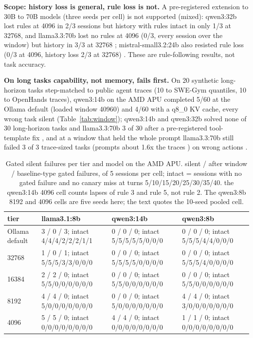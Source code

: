 \documentclass[conference,10pt]{IEEEtran}
\begin{document}
\textbf{Scope: history loss is general, rule loss is not.} A pre-registered extension to 30B to 70B models (three seeds per cell) is not supported (mixed): qwen3:32b lost rules at 4096 in 2/3 sessions but history with rules intact in only 1/3 at 32768, and llama3.3:70b lost no rules at 4096 (0/3, every session over the window) but history in 3/3 at 32768%
; mistral-small3.2:24b also resisted rule loss (0/3 at 4096, history loss 2/3 at 32768)%
. These are rule-following results, not task accuracy.

\textbf{On long tasks capability, not memory, fails first.} On 20 synthetic long-horizon tasks step-matched to public agent traces (10 to SWE-Gym quantiles, 10 to OpenHands traces), qwen3:14b on the AMD APU completed 5/60 at the Ollama default (loaded window 40960) and 4/60 with a q8\_0 KV cache, every wrong task silent %
(Table~\ref{tab:window}); qwen3:14b and qwen3:32b solved none of 30 long-horizon tasks and llama3.3:70b 3 of 30 after a pre-registered tool-template fix%
, and at a window that held the whole prompt llama3.3:70b still failed 3 of 3 trace-sized tasks (prompts about 1.6x the traces%
) on wrong actions%
.

\begin{table}[t]
\caption{Gated silent failures per tier and model on the AMD APU. silent / after window / baseline-type gated failures, of 5 sessions per cell; intact = sessions with no gated failure and no canary miss at turns 5/10/15/20/25/30/35/40. the qwen3:14b 4096 cell counts lapses of rule 3 and rule 5, not rule 2. The qwen3:8b 8192 and 4096 cells are five seeds here; the text quotes the 10-seed pooled cell.}
\label{tab:r2gated}
\centering\footnotesize
\begin{tabular}{@{}llll@{}}
\toprule
tier & llama3.1:8b & qwen3:14b & qwen3:8b \\
\midrule
Ollama default & 3 / 0 / 3; intact 4/4/4/2/2/2/1/1 & 0 / 0 / 0; intact 5/5/5/5/5/0/0/0 & 0 / 0 / 0; intact 5/5/5/4/4/0/0/0 \\
32768 & 1 / 0 / 1; intact 5/5/5/3/3/0/0/0 & 0 / 0 / 0; intact 5/5/5/5/0/0/0/0 & 0 / 0 / 0; intact 5/5/5/4/0/0/0/0 \\
16384 & 2 / 2 / 0; intact 5/5/0/0/0/0/0/0 & 0 / 0 / 0; intact 5/5/0/0/0/0/0/0 & 0 / 0 / 0; intact 5/5/0/0/0/0/0/0 \\
8192 & 4 / 4 / 0; intact 5/0/0/0/0/0/0/0 & 0 / 0 / 0; intact 5/0/0/0/0/0/0/0 & 4 / 4 / 0; intact 3/0/0/0/0/0/0/0 \\
4096 & 5 / 5 / 0; intact 0/0/0/0/0/0/0/0 & 4 / 4 / 0; intact 0/0/0/0/0/0/0/0 & 1 / 1 / 0; intact 0/0/0/0/0/0/0/0 \\
\bottomrule
\end{tabular}
\end{table}
\end{document}
